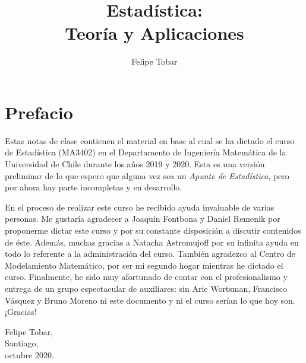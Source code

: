 \documentclass[letterpaper,12pt, ]{amsbook}
\title{Estadística:\\ \Large{Teoría y Aplicaciones}}
\author{Felipe Tobar}
\begin{document}
\maketitle
\tableofcontents
\section*{Prefacio}
Estas notas de clase contienen el material en base al cual se ha dictado el curso de Estadística (MA3402) en el Departamento de Ingeniería Matemática de la Universidad de Chile durante los años 2019 y 2020. Esta es una versión preliminar de lo que espero que alguna vez sea un \emph{Apunte de Estadística}, pero por ahora hay parte incompletas y en desarrollo. 

En el proceso de realizar este curso he recibido ayuda invaluable de varias personas. Me gustaría agradecer a Joaquín Fontbona y Daniel Remenik por proponerme dictar este curso y por su constante disposición a discutir contenidos de éste. Además, muchas gracias a Natacha Astromujoff por su infinita ayuda en todo lo referente a la administración del curso. También agradezco al Centro de Modelamiento Matemático, por ser mi segundo hogar mientras he dictado el curso. Finalmente, he sido muy afortunado de contar con el profesionalismo y entrega de un grupo espectacular de auxiliares: sin Arie Wortsman, Francisco Vásquez y Bruno Moreno ni este documento y ni el curso serían lo que hoy son. ¡Gracias!

\vspace{3em}
\noindent Felipe Tobar, \\
Santiago, \\
octubre 2020. 













\end{document}

